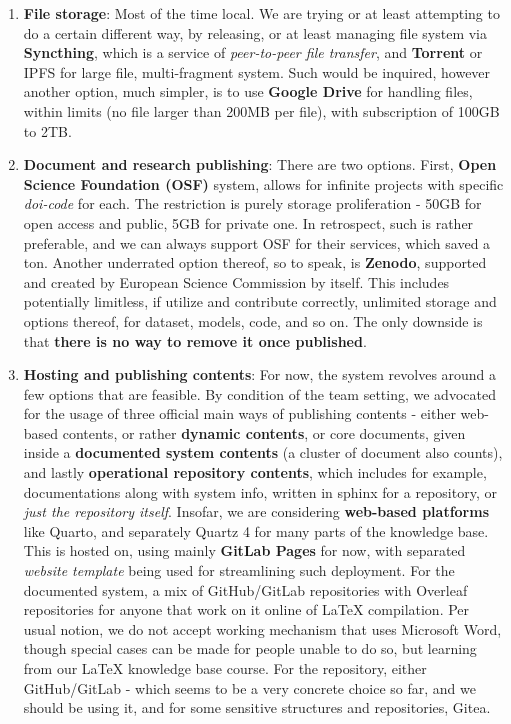 \documentclass[10pt,a4paper]{article}
\begin{document}
\begin{enumerate}
    \item \textbf{File storage}: Most of the time local. We are trying or at least attempting to do a certain different way, by releasing, or at least managing file system via \textbf{Syncthing}, which is a service of \textit{peer-to-peer file transfer}, and \textbf{Torrent} or IPFS for large file, multi-fragment system. Such would be inquired, however another option, much simpler, is to use \textbf{Google Drive} for handling files, within limits (no file larger than 200MB per file), with subscription of 100GB to 2TB. 
    \item \textbf{Document and research publishing}: There are two options. First, \textbf{Open Science Foundation (OSF)} system, allows for infinite projects with specific \textit{doi-code} for each. The restriction is purely storage proliferation - 50GB for open access and public, 5GB for private one. In retrospect, such is rather preferable, and we can always support OSF for their services, which saved a ton. Another underrated option thereof, so to speak, is \textbf{Zenodo}, supported and created by European Science Commission by itself. This includes potentially limitless, if utilize and contribute correctly, unlimited storage and options thereof, for dataset, models, code, and so on. The only downside is that \textbf{there is no way to remove it once published}.
    \item \textbf{Hosting and publishing contents}: For now, the system revolves around a few options that are feasible. By condition of the team setting, we advocated for the usage of three official main ways of publishing contents - either web-based contents, or rather \textbf{dynamic contents}, or core documents, given inside a \textbf{documented system contents} (a cluster of document also counts), and lastly \textbf{operational repository contents}, which includes for example, documentations along with system info, written in sphinx for a repository, or \textit{just the repository itself}. Insofar, we are considering \textbf{web-based platforms} like Quarto, and separately Quartz 4 for many parts of the knowledge base. This is hosted on, using mainly \textbf{GitLab Pages} for now, with separated \textit{website template} being used for streamlining such deployment. For the documented system, a mix of GitHub/GitLab repositories with Overleaf repositories for anyone that work on it online of LaTeX compilation. Per usual notion, we do not accept working mechanism that uses Microsoft Word, though special cases can be made for people unable to do so, but learning from our LaTeX knowledge base course. For the repository, either GitHub/GitLab - which seems to be a very concrete choice so far, and we should be using it, and for some sensitive structures and repositories, Gitea. 

\end{enumerate}
\end{document}
